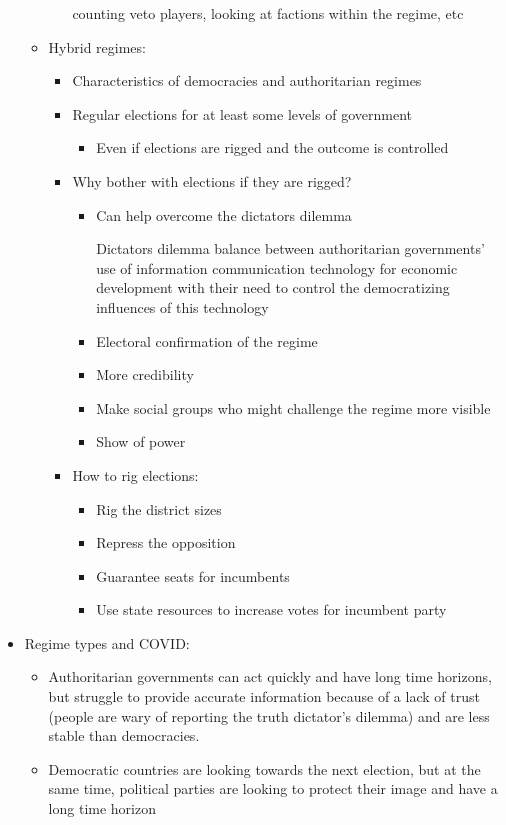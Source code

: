 \documentclass[11pt]{article}
\begin{document}
\begin{itemize}
\begin{itemize}
\begin{itemize}
counting veto players, looking at factions within the regime, etc
\end{itemize}
\item Hybrid regimes:
\begin{itemize}
\item Characteristics of democracies and authoritarian regimes
\item Regular elections for at least some levels of government
\begin{itemize}
\item Even if elections are rigged and the outcome is controlled
\end{itemize}
\item Why bother with elections if they are rigged?
\begin{itemize}
\item Can help overcome the dictators dilemma
\item[{Dictators dilemma}] balance between authoritarian governments' use of
information communication technology for economic development with their
need to control the democratizing influences of this technology
\item Electoral confirmation of the regime
\item More credibility
\item Make social groups who might challenge the regime more visible
\item Show of power
\end{itemize}
\item How to rig elections:
\begin{itemize}
\item Rig the district sizes
\item Repress the opposition
\item Guarantee seats for incumbents
\item Use state resources to increase votes for incumbent party
\end{itemize}
\end{itemize}
\end{itemize}
\item Regime types and COVID:
\begin{itemize}
\item Authoritarian governments can act quickly and have long time horizons, but
struggle to provide accurate information because of a lack of trust (people
are wary of reporting the truth dictator's dilemma) and are less stable than
democracies.
\item Democratic countries are looking towards the next election, but at the same
time, political parties are looking to protect their image and have a long
time horizon
\end{itemize}
\end{itemize}
\end{document}
